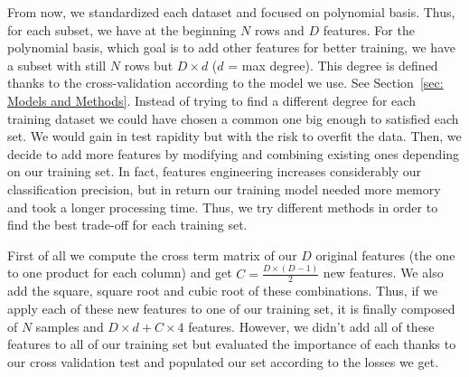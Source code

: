 \documentclass[10pt,conference,compsocconf]{IEEEtran}
\begin{document}

From now, we standardized each dataset and focused on polynomial basis. Thus, for each subset, we have at the beginning $N$ rows and $D$ features. For the polynomial basis, which goal is to add other features for better training, we have a subset with still $N$ rows but $D\times d$ ($d$ = max degree). This degree is defined thanks to the cross-validation according to the model we use. See Section~\ref{sec: Models and Methods}. Instead of trying to find a different degree for each training dataset we could have chosen a common one big enough to satisfied each set. We would gain in test rapidity but with the risk to overfit the data. Then, we decide to add more features by modifying and combining existing ones depending on our training set. In fact, features engineering increases considerably our classification precision, but in return our training model needed more memory and took a longer processing time. Thus, we try different methods in order to find the best trade-off for each training set. 

First of all we compute the cross term matrix of our $D$ original features (the one to one product for each column) and get $C = \frac{D\times(D-1)}{2}$ new features. We also add the square, square root and cubic root of these combinations. Thus, if we apply each of these new features to one of our training set, it is finally composed of $N$ samples and $D\times d + C\times4$ features. However, we didn't add all of these features to all of our training set but evaluated the importance of each thanks to our cross validation test and populated our set according to the losses we get. 

\end{document}

